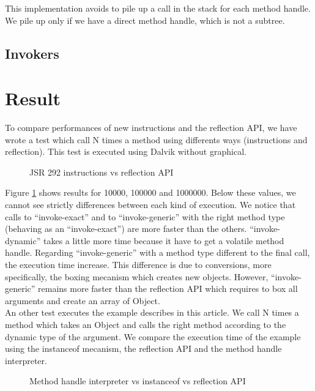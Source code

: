 \documentclass{sig-alternate}
\def \DALVIK{Dalvik\xspace}
\begin{document}
        This implementation avoids to pile up a call in the stack for each method handle.
        We pile up only if we have a direct method handle, which is not a subtree.

    \subsection{Invokers}

\section{Result}

  To compare performances of new instructions and the reflection API,
  we have wrote a test which call N times a method using differents ways (instructions and reflection).
  This test is executed using \DALVIK without graphical.

  \begin{figure}[!h]
    \resizebox{\linewidth}{!}{}
    \caption{JSR 292 instructions vs reflection API}
    \label{Rinvoke}
  \end{figure}

  Figure \ref{Rinvoke} shows results for 10000, 100000 and 1000000.
  Below these values, we cannot see strictly differences between each kind of execution.
  We notice that calls to ``invoke-exact'' and to ``invoke-generic'' with the right method type (behaving as an ``invoke-exact'') are more faster than the others.
  ``invoke-dynamic'' takes a little more time because it have to get a volatile method handle.
  Regarding ``invoke-generic'' with a method type different to the final call, the execution time increase.
  This difference is due to conversions, more specifically, the boxing mecanism which creates new objects.
  However, ``invoke-generic'' remains more faster than the reflection API which requires to box all arguments and create an array of Object.\\
  
  An other test executes the example describes in this article.
  We call N times a method which takes an Object and calls the right method according to the dynamic type of the argument.
  We compare the execution time of the example using the instanceof mecanism, the reflection API and the method handle interpreter.

  \begin{figure}[!h]
    \resizebox{\linewidth}{!}{}
    \caption{Method handle interpreter vs instanceof vs reflection API}
    \label{Rmutable}
  \end{figure}
\end{document}
